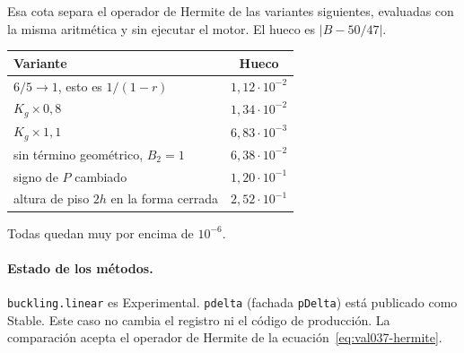 Esa cota separa el operador de Hermite de las variantes siguientes, evaluadas con la misma aritmética y sin ejecutar el motor. El hueco es \(|B-50/47|\).

\begin{center}\small
\begin{tabular}{lc}\toprule
Variante & Hueco\\\midrule
\(6/5\to 1\), esto es \(1/(1-r)\) & \(1{,}12\cdot 10^{-2}\)\\
\(K_g\times 0{,}8\) & \(1{,}34\cdot 10^{-2}\)\\
\(K_g\times 1{,}1\) & \(6{,}83\cdot 10^{-3}\)\\
sin término geométrico, \(B_2=1\) & \(6{,}38\cdot 10^{-2}\)\\
signo de \(P\) cambiado & \(1{,}20\cdot 10^{-1}\)\\
altura de piso \(2h\) en la forma cerrada & \(2{,}52\cdot 10^{-1}\)\\
\bottomrule\end{tabular}
\end{center}

Todas quedan muy por encima de \(10^{-6}\).

\paragraph{Estado de los métodos.}
\texttt{buckling.linear} es Experimental. \texttt{pdelta} (fachada \texttt{pDelta}) está publicado como Stable. Este caso no cambia el registro ni el código de producción. La comparación acepta el operador de Hermite de la ecuación~\eqref{eq:val037-hermite}.
